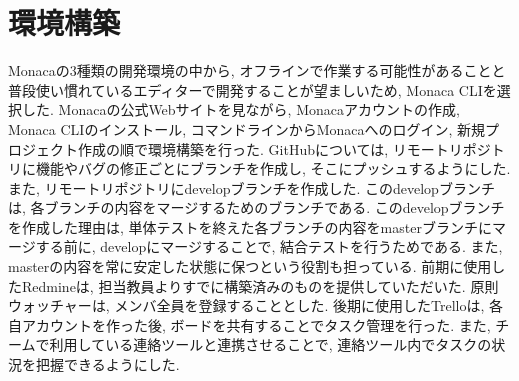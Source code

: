 
\section{環境構築}%
Monacaの3種類の開発環境の中から, オフラインで作業する可能性があることと普段使い慣れているエディターで開発することが望ましいため, Monaca CLIを選択した. Monacaの公式Webサイト\cite{tutorial_monaca_CLI}を見ながら, Monacaアカウントの作成, Monaca CLIのインストール, コマンドラインからMonacaへのログイン, 新規プロジェクト作成の順で環境構築を行った. GitHubについては, リモートリポジトリに機能やバグの修正ごとにブランチを作成し, そこにプッシュするようにした. また, リモートリポジトリにdevelopブランチを作成した. このdevelopブランチは, 各ブランチの内容をマージするためのブランチである. このdevelopブランチを作成した理由は, 単体テストを終えた各ブランチの内容をmasterブランチにマージする前に, developにマージすることで, 結合テストを行うためである. また, masterの内容を常に安定した状態に保つという役割も担っている. 前期に使用したRedmineは, 担当教員よりすでに構築済みのものを提供していただいた. 原則ウォッチャー\cite{Redmine}は, メンバ全員を登録することとした. 後期に使用したTrelloは, 各自アカウントを作った後, ボードを共有することでタスク管理を行った. また, チームで利用している連絡ツールと連携させることで, 連絡ツール内でタスクの状況を把握できるようにした.

